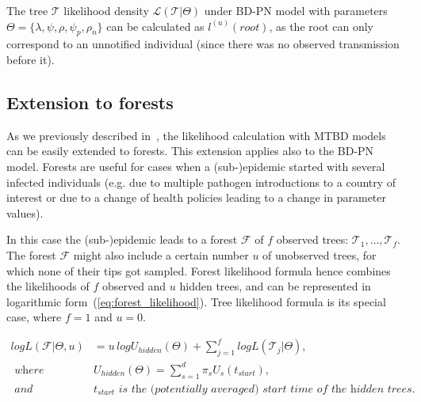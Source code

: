 \documentclass[a4paper,10pt]{article}
\begin{document}
\bigskip

The tree $\mathscr{T}$ likelihood density $\mathscr{L}(\mathscr{T}|\Theta)$ under BD-PN model with parameters $\Theta=\{\lambda, \psi, \rho, \psi_p, \rho_n\}$ can be calculated as $l^{(u)}(root)$, as the root can only correspond to an unnotified individual (since there was no observed transmission before it).



\subsection{Extension to forests}

As we previously described in~\citep{zhukovaFastAccurateMaximumLikelihood2022}, the likelihood calculation with MTBD models can be easily extended to forests. This extension applies also to the BD-PN model. Forests are useful for cases when a (sub-)epidemic started with several infected individuals (e.g. due to multiple pathogen introductions to a country of interest or due to a change of health policies leading to a change in parameter values).

In this case the (sub-)epidemic leads to a forest $\mathscr{F}$ of $f$ observed trees: $\mathscr{T}_1, \ldots, \mathscr{T}_f$. The forest $\mathscr{F}$ might also include a certain number $u$ of unobserved trees, for which none of their tips got sampled.
Forest likelihood formula hence combines the likelihoods of $f$ observed and $u$ hidden trees, and can be represented in logarithmic form~(\ref{eq:forest_likelihood}). Tree likelihood formula %
is its special case, where $f=1$ and $u=0$. 


\begin{equation}
\begin{split}
logL(\mathscr{F}|\Theta,u)&=u\,logU_{hidden}(\Theta) + \sum\limits_{j=1}^f logL(\mathscr{T}_j|\Theta), \\
\textit{ where }& U_{hidden}(\Theta)=\sum\limits_{s=1}^{d}\pi_s U_s(t_{start}),\\
\textit{ and }& t_{start} \textit{ is the (potentially averaged) start time of the hidden trees.}
\end{split} \label{eq:forest_likelihood} 
\end{equation}
\end{document}
